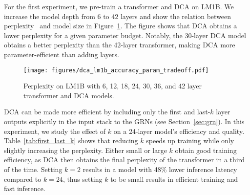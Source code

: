 
For the first experiment, we pre-train a transformer and DCA on LM1B. We increase the model depth from 6 to 42 layers and show the relation between perplexity~\citep{jelinek1977perplexity} and model size in Figure~\ref{fig:lm1b_accuracy_param_tradeoff}. The figure shows that DCA obtains a lower perplexity for a given parameter budget. Notably, the 30-layer DCA model obtains a better perplexity than the 42-layer transformer, making DCA more parameter-efficient than adding layers.

\begin{figure}[h]
    \centering
    \texttt{[image: figures/dca\_lm1b\_accuracy\_param\_tradeoff.pdf]}
    \vskip -0.1in
    \caption{Perplexity on LM1B with 6, 12, 18, 24, 30, 36, and 42 layer transformer and DCA models.}
    \label{fig:lm1b_accuracy_param_tradeoff}
\end{figure}

 DCA can be made more efficient by including only the first and last-$k$ layer outputs explicitly in the input stack to the GRNs (see Section~\ref{sec:grn}). In this experiment, we study the effect of $k$ on a 24-layer model's efficiency and quality. Table~\ref{tab:first_last_k} shows that reducing $k$ speeds up training while only slightly increasing the perplexity. Either small or large $k$ obtain good training efficiency, as DCA then obtains the final perplexity of the transformer in a third of the time. Setting $k = 2$ results in a model with 48\% lower inference latency compared to $k=24$, thus setting $k$ to be small results in efficient training and fast inference. 

